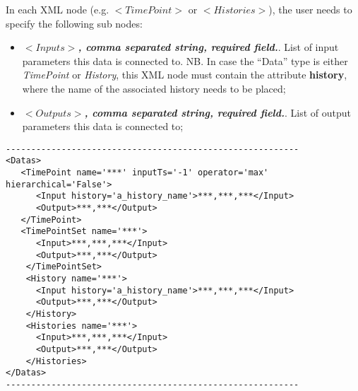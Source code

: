 \vspace{-5mm}
In each XML node (e.g. $<TimePoint>$ or $<Histories>$), the user needs to specify the following sub nodes:
\begin{itemize}
 \item $<Inputs>$\textbf{\textit{, comma separated string, required field.}}.  List of input parameters this data is connected to. NB. In case the ``Data'' type is either \textit{TimePoint} or  \textit{History}, this XML node must contain the attribute \textbf{history}, where the name of the associated history needs to be placed;
 \item $<Outputs>$\textbf{\textit{, comma separated string, required field.}}.  List of output parameters this data is connected to;
\end{itemize}

\begin{lstlisting}[style=XML]
----------------------------------------------------------
<Datas> 
   <TimePoint name='***' inputTs='-1' operator='max' hierarchical='False'>  
      <Input history='a_history_name'>***,***,***</Input>
      <Output>***,***</Output>
   </TimePoint> 
   <TimePointSet name='***'>  
      <Input>***,***,***</Input>
      <Output>***,***</Output>
    </TimePointSet> 
    <History name='***'>  
      <Input history='a_history_name'>***,***,***</Input>
      <Output>***,***</Output>
    </History> 
    <Histories name='***'>  
      <Input>***,***,***</Input>
      <Output>***,***</Output>
    </Histories> 
</Datas>
----------------------------------------------------------
\end{lstlisting}

